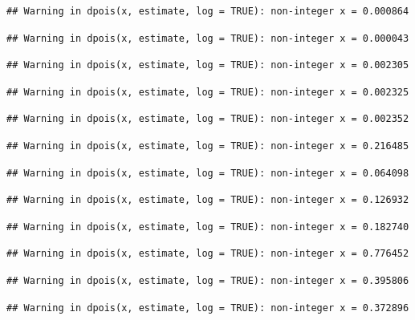 \documentclass[]{article}
\begin{document}
\begin{verbatim}
## Warning in dpois(x, estimate, log = TRUE): non-integer x = 0.000864
\end{verbatim}

\begin{verbatim}
## Warning in dpois(x, estimate, log = TRUE): non-integer x = 0.000043
\end{verbatim}

\begin{verbatim}
## Warning in dpois(x, estimate, log = TRUE): non-integer x = 0.002305
\end{verbatim}

\begin{verbatim}
## Warning in dpois(x, estimate, log = TRUE): non-integer x = 0.002325
\end{verbatim}

\begin{verbatim}
## Warning in dpois(x, estimate, log = TRUE): non-integer x = 0.002352
\end{verbatim}

\begin{verbatim}
## Warning in dpois(x, estimate, log = TRUE): non-integer x = 0.216485
\end{verbatim}

\begin{verbatim}
## Warning in dpois(x, estimate, log = TRUE): non-integer x = 0.064098
\end{verbatim}

\begin{verbatim}
## Warning in dpois(x, estimate, log = TRUE): non-integer x = 0.126932
\end{verbatim}

\begin{verbatim}
## Warning in dpois(x, estimate, log = TRUE): non-integer x = 0.182740
\end{verbatim}

\begin{verbatim}
## Warning in dpois(x, estimate, log = TRUE): non-integer x = 0.776452
\end{verbatim}

\begin{verbatim}
## Warning in dpois(x, estimate, log = TRUE): non-integer x = 0.395806
\end{verbatim}

\begin{verbatim}
## Warning in dpois(x, estimate, log = TRUE): non-integer x = 0.372896
\end{verbatim}
\end{document}
